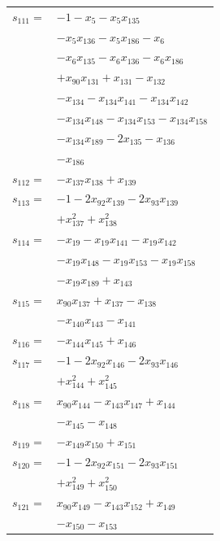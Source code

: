 \begin{longtable}{@{}r@{\;}l@{}}
\(s_{111}=\) & \(\displaystyle -1 -x_{5} -x_{5}x_{135}\) \\
 & \(\displaystyle -x_{5}x_{136} -x_{5}x_{186} -x_{6}\) \\
 & \(\displaystyle -x_{6}x_{135} -x_{6}x_{136} -x_{6}x_{186}\) \\
 & \(\displaystyle +x_{90}x_{131} +x_{131} -x_{132}\) \\
 & \(\displaystyle -x_{134} -x_{134}x_{141} -x_{134}x_{142}\) \\
 & \(\displaystyle -x_{134}x_{148} -x_{134}x_{153} -x_{134}x_{158}\) \\
 & \(\displaystyle -x_{134}x_{189} -2x_{135} -x_{136}\) \\
 & \(\displaystyle -x_{186}\) \\[3pt]
\(s_{112}=\) & \(\displaystyle -x_{137}x_{138} +x_{139}\) \\[3pt]
\(s_{113}=\) & \(\displaystyle -1 -2x_{92}x_{139} -2x_{93}x_{139}\) \\
 & \(\displaystyle +x_{137}^{2} +x_{138}^{2}\) \\[3pt]
\(s_{114}=\) & \(\displaystyle -x_{19} -x_{19}x_{141} -x_{19}x_{142}\) \\
 & \(\displaystyle -x_{19}x_{148} -x_{19}x_{153} -x_{19}x_{158}\) \\
 & \(\displaystyle -x_{19}x_{189} +x_{143}\) \\[3pt]
\(s_{115}=\) & \(\displaystyle x_{90}x_{137} +x_{137} -x_{138}\) \\
 & \(\displaystyle -x_{140}x_{143} -x_{141}\) \\[3pt]
\(s_{116}=\) & \(\displaystyle -x_{144}x_{145} +x_{146}\) \\[3pt]
\(s_{117}=\) & \(\displaystyle -1 -2x_{92}x_{146} -2x_{93}x_{146}\) \\
 & \(\displaystyle +x_{144}^{2} +x_{145}^{2}\) \\[3pt]
\(s_{118}=\) & \(\displaystyle x_{90}x_{144} -x_{143}x_{147} +x_{144}\) \\
 & \(\displaystyle -x_{145} -x_{148}\) \\[3pt]
\(s_{119}=\) & \(\displaystyle -x_{149}x_{150} +x_{151}\) \\[3pt]
\(s_{120}=\) & \(\displaystyle -1 -2x_{92}x_{151} -2x_{93}x_{151}\) \\
 & \(\displaystyle +x_{149}^{2} +x_{150}^{2}\) \\[3pt]
\(s_{121}=\) & \(\displaystyle x_{90}x_{149} -x_{143}x_{152} +x_{149}\) \\
 & \(\displaystyle -x_{150} -x_{153}\) \\[3pt]

\end{longtable}
